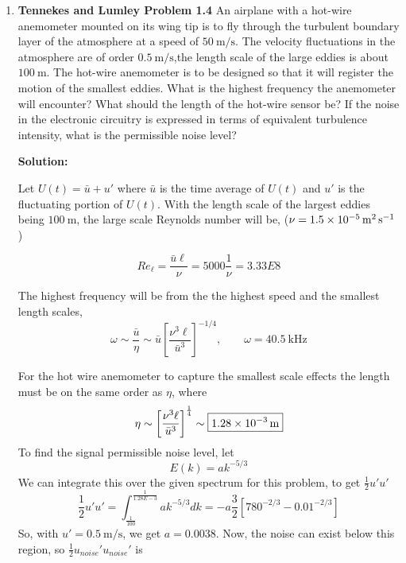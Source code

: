 \documentclass[12pt]{article}
\newenvironment{Solution}
    {\textbf{Solution:}
    
    \vspace{5mm}
    \begin{tcolorbox}
    }
    {
    \end{tcolorbox}
    \vspace{5mm}
    }
\begin{document}

\begin{enumerate}



\item  \small{\textbf{Tennekes and Lumley Problem 1.4} An airplane with a hot-wire anemometer mounted on its wing tip is to fly through the turbulent boundary layer of the atmosphere at a speed of $\SI{50}{\meter\per\second}$. The velocity fluctuations in the atmosphere are of order $\SI{0.5}{\meter\per\second}$,the length scale of the large eddies is about $\SI{100}{\meter}$. The hot-wire anemometer is to be designed so that it will register the motion of the smallest eddies. What is the highest frequency the anemometer will encounter? What should the length of the hot-wire sensor be? If the noise in the electronic circuitry is expressed in terms of equivalent turbulence intensity, what is the permissible noise level?}

\begin{Solution}
Let $U(t) = \bar{u} + u'$ where $\bar{u}$ is the time average of $U(t)$ and $u'$ is the fluctuating portion of $U(t)$. 
With the length scale of the largest eddies being $\SI{100}{\meter}$, the large scale Reynolds number will be, ($\nu = \SI{1.5E-5}{\meter\squared\per\second}$)

\begin{equation}
    Re_\ell = \frac{\bar{u} \ell}{\nu} = 5000 \frac{1}{\nu} = 3.33E8
\end{equation}

The highest frequency will be from the the highest speed and the smallest length scales, 
\begin{equation}
    \omega \sim \frac{\bar{u}}{\eta} \sim \bar{u}\left[\frac{\nu^3\ell}{\bar{u}^3}\right]^{-1/4}, \qquad   \boxed{\omega = \SI{40.5}{\kilo\hertz}}
\end{equation}

For the hot wire anemometer to capture the smallest scale effects the length must be on the same order as $\eta$, where 
\begin{equation}
    \eta \sim  \left[\frac{\nu^3\ell}{\bar{u}^3}\right]^{\frac{1}{4}} \sim \boxed{\SI{1.28E-3}{\meter}}
\end{equation}
To find the signal permissible noise level, let
\begin{equation}
    E(k) = a k^{-5/3}
\end{equation}
We can integrate this over the given spectrum for this problem, to get $\frac{1}{2}u'u'$
\begin{equation}
    \frac{1}{2}u' u' = \int_\frac{1}{100} ^\frac{1}{1.28E-3} a k^{-5/3} dk = -a\frac{3}{2}\left[780^{-2/3} -  0.01^{-2/3}\right]
\end{equation}
So, with $u'=\SI{0.5}{\meter\per\second}$, we get $a = 0.0038$. Now, the noise can exist below this region, so $\frac{1}{2}u_{noise}' u_{noise}'$ is 


\end{Solution}
\end{enumerate}
\end{document}
